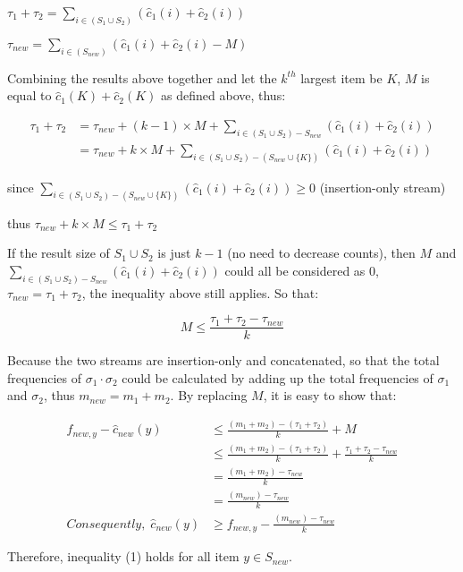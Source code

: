 \documentclass[12pt]{article}
\begin{document}
\begin{center}
$\tau_1 + \tau_2 = \sum_{i \in (S_1 \cup S_2)}{(\hat{c}_{1}(i) + \hat{c}_{2}(i))}$
\end{center}

\begin{center}
$\tau_{new} = \sum_{i \in (S_{new})}{(\hat{c}_{1}(i) + \hat{c}_{2}(i) - M)}$
\end{center}

Combining the results above together and let the $k^{th}$ largest item be $K$, $M$ is equal to $\hat{c}_{1}(K) + \hat{c}_{2}(K)$ as defined above, thus:

\begin{equation}
\begin{aligned}
\tau_1 + \tau_2 &= \tau_{new} + (k-1) \times M + \sum_{i \in (S_1 \cup S_2) - S_{new}}{(\hat{c}_{1}(i) + \hat{c}_{2}(i))} \\
&= \tau_{new} + k \times M + \sum_{i \in (S_1 \cup S_2) - (S_{new} \cup \{K\})}{(\hat{c}_{1}(i) + \hat{c}_{2}(i))}
\end{aligned}
\end{equation}

\begin{center}
since $\sum_{i \in (S_1 \cup S_2) - (S_{new} \cup \{K\})}{(\hat{c}_{1}(i) + \hat{c}_{2}(i))} \geq 0$ (insertion-only stream)
\end{center}

\begin{center}
thus $\tau_{new} + k \times M \leq \tau_1 + \tau_2$
\end{center}

If the result size of $S_1 \cup S_2$ is just $k-1$ (no need to decrease counts), then $M$ and $\sum_{i \in (S_1 \cup S_2) - S_{new}}{(\hat{c}_{1}(i) + \hat{c}_{2}(i))}$ could all be considered as 0, $\tau_{new} = \tau_1 + \tau_2$, the inequality above still applies. So that:

\begin{equation}
    M \leq \frac{\tau_1 + \tau_2 - \tau_{new}}{k}
\end{equation}

Because the two streams are insertion-only and concatenated, so that the total frequencies of $\sigma_1 \cdot \sigma_2$ could be calculated by adding up the total frequencies of $\sigma_1$ and $\sigma_2$, thus $m_{new} = m_1 + m_2$. By replacing $M$, it is easy to show that:

\begin{equation}
\begin{aligned}
f_{new,y} - \hat{c}_{new}(y) &\leq \frac{(m_1 + m_2) - (\tau_1 + \tau_2)}{k} + M \\
&\leq \frac{(m_1 + m_2) - (\tau_1 + \tau_2)}{k} + \frac{\tau_1 + \tau_2 - \tau_{new}}{k} \\
&= \frac{(m_1 + m_2) - \tau_{new}}{k} \\
&= \frac{(m_{new}) - \tau_{new}}{k} \\
Consequently, \; \hat{c}_{new}(y) &\geq f_{new,y} - \frac{(m_{new}) - \tau_{new}}{k}
\end{aligned}
\end{equation}

Therefore, inequality (1) holds for all item $y \in S_{new}$.
\end{document}
